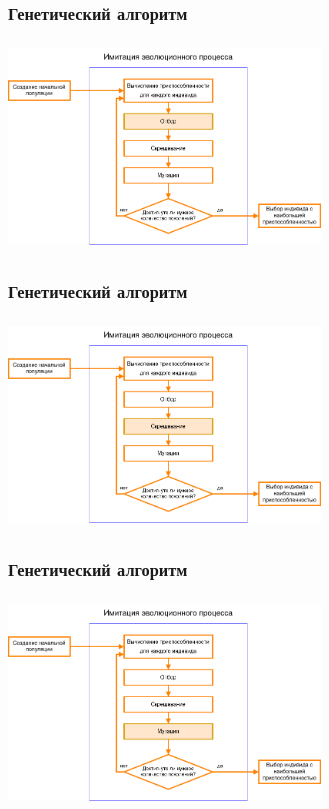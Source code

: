 \documentclass{spbseu}
\begin{document}
    \begin{frame}
		\frametitle{Генетический алгоритм}
        \begin{center}
            \includegraphics[width=313px,height=211px]{images/selection}
        \end{center}
    \end{frame}
    
    \begin{frame}
		\frametitle{Генетический алгоритм}
        \begin{center}
            \includegraphics[width=313px,height=211px]{images/crossover}
        \end{center}
    \end{frame}
    
    \begin{frame}
		\frametitle{Генетический алгоритм}
        \begin{center}
            \includegraphics[width=313px,height=211px]{images/mutation}
        \end{center}
    \end{frame}
    
\end{document}
